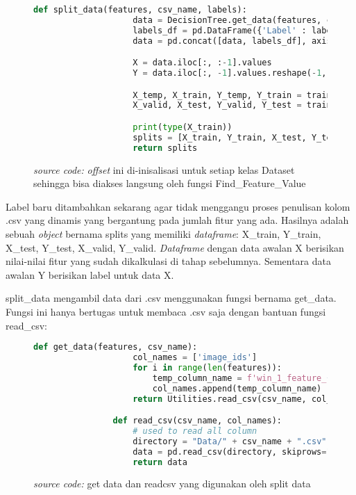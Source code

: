 		\begin{figure}[H]
			\begin{lstlisting}[language=Python, basicstyle=\tiny]
				def split_data(features, csv_name, labels):
					data = DecisionTree.get_data(features, csv_name)
					labels_df = pd.DataFrame({'Label' : labels})
					data = pd.concat([data, labels_df], axis=1)

					X = data.iloc[:, :-1].values 
					Y = data.iloc[:, -1].values.reshape(-1, 1)

					X_temp, X_train, Y_temp, Y_train = train_test_split(X, Y, test_size=0.3, random_state=42)
					X_valid, X_test, Y_valid, Y_test = train_test_split(X_temp, Y_temp, test_size=0.5, random_state=42)

					print(type(X_train))
					splits = [X_train, Y_train, X_test, Y_test, X_valid, Y_valid]
					return splits
			\end{lstlisting}
			\caption{\emph{source code:} \textit{offset} ini di-inisalisasi untuk setiap kelas Dataset 
			sehingga bisa diakses langsung oleh fungsi Find\_Feature\_Value}
			\label{code: spliting dataset}
		\end{figure}

		Label baru ditambahkan sekarang agar tidak menggangu proses penulisan kolom .csv yang dinamis 
		yang bergantung pada jumlah fitur yang ada. Hasilnya adalah sebuah \textit{object} bernama splits 
		yang memiliki \textit{dataframe}: X\_train, Y\_train, X\_test, Y\_test, X\_valid, Y\_valid. \textit{Dataframe} 
		dengan data awalan X berisikan nilai-nilai fitur yang sudah dikalkulasi di tahap sebelumnya. 
		Sementara data awalan Y berisikan label untuk data X.

		split\_data mengambil data dari .csv menggunakan fungsi bernama get\_data. Fungsi ini 
		hanya bertugas untuk membaca .csv saja dengan bantuan fungsi read\_csv:
		
		\begin{figure}[H]
			\begin{lstlisting}[language=Python, basicstyle=\tiny]
				def get_data(features, csv_name):
					col_names = ['image_ids']
					for i in range(len(features)):
						temp_column_name = f'win_1_feature_{i}'
						col_names.append(temp_column_name)
					return Utilities.read_csv(csv_name, col_names)

				def read_csv(csv_name, col_names):
					# used to read all column
					directory = "Data/" + csv_name + ".csv"
					data = pd.read_csv(directory, skiprows=1, header=None, names = col_names)
					return data
			\end{lstlisting}
			\caption{\emph{source code:} get data dan readcsv yang digunakan oleh split data}
			\label{code: get data and read csv}
		\end{figure}


